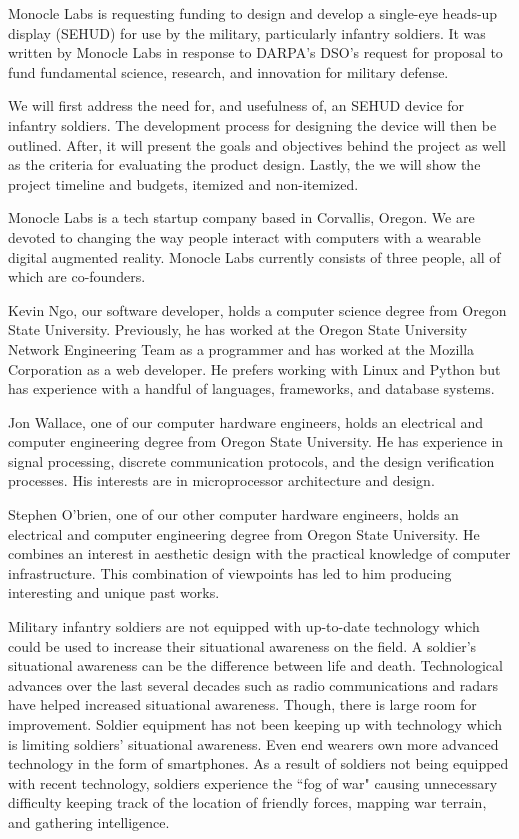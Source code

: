 Monocle Labs is requesting funding to design and develop a single-eye heads-up
display (SEHUD) for use by the military, particularly infantry soldiers. It was
written by Monocle Labs in response to DARPA's DSO's request for proposal to
fund fundamental science, research, and innovation for military defense.

We will first address the need for, and usefulness of, an SEHUD
device for infantry soldiers. The development process for designing the device
will then be outlined. After, it will present the goals and objectives behind
the project as well as the criteria for evaluating the product design. Lastly,
the we will show the project timeline and budgets, itemized and
non-itemized.

Monocle Labs is a tech startup company based in Corvallis, Oregon. We are
devoted to changing the way people interact with computers with a wearable
digital augmented reality. Monocle Labs currently consists of three people, all
of which are co-founders.

Kevin Ngo, our software developer, holds a computer science degree from
Oregon State University. Previously, he has worked at the Oregon State
University Network Engineering Team as a programmer and has worked at the
Mozilla Corporation as a web developer. He prefers working with Linux and
Python but has experience with a handful of languages, frameworks, and database
systems.

Jon Wallace, one of our computer hardware engineers, holds an electrical
and computer engineering degree from Oregon State University. He has experience
in signal processing, discrete communication protocols, and the design
verification processes. His interests are in microprocessor architecture and
design.

Stephen O'brien, one of our other computer hardware engineers, holds an
electrical and computer engineering degree from Oregon State University. He
combines an interest in aesthetic design with the practical knowledge of
computer infrastructure. This combination of viewpoints has led to him
producing interesting and unique past works.

Military infantry soldiers are not equipped with up-to-date technology
which could be used to increase their situational awareness on the field. A
soldier's situational awareness can be the difference between life and death.
Technological advances over the last several decades such as radio
communications and radars have helped increased situational awareness. Though,
there is large room for improvement. Soldier equipment has not been keeping up
with technology which is limiting soldiers' situational awareness. Even end
wearers own more advanced technology in the form of smartphones. As a
result of soldiers not being equipped with recent technology, soldiers
experience the ``fog of war" causing unnecessary difficulty keeping track of
the location of friendly forces, mapping war terrain, and gathering
intelligence.

